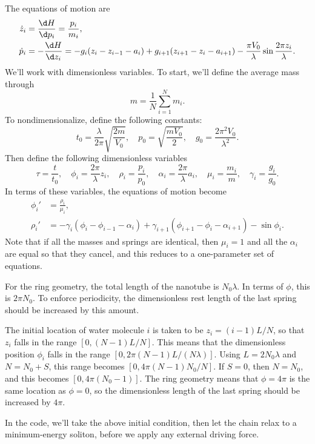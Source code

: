 \documentclass[11pt]{article}
\begin{document}
The equations of motion are
\begin{align*}
\dot{z}_i&=\frac{\d H}{\d p_i}=\frac{p_i}{m_i},\\
\dot{p}_i&=-\frac{\d H}{\d z_i}=-g_i(z_i-z_{i-1}-a_i)
	+g_{i+1}(z_{i+1}-z_i-a_{i+1})
	-\frac{\pi V_0}{\lambda}\sin\frac{2\pi z_i}{\lambda}.
\end{align*}
We'll work with dimensionless variables. To start, we'll define the average mass through
\[
m=\frac{1}{N}\sum_{i=1}^N m_i.
\]
To nondimensionalize, define the following constants:
\[
t_0 = \frac{\lambda}{2\pi}\sqrt{\frac{2m}{V_0}},\quad
p_0 = \sqrt{\frac{mV_0}{2}},\quad
g_0 = \frac{2\pi^2V_0}{\lambda^2}.
\]
Then define the following dimensionless variables
\[
\tau=\frac{t}{t_0},\quad
\phi_i=\frac{2\pi}{\lambda} z_i,\quad
\rho_i=\frac{p_i}{p_0},\quad
\alpha_i=\frac{2\pi}{\lambda} a_i,\quad
\mu_i=\frac{m_i}{m},\quad
\gamma_i=\frac{g_i}{g_0}.
\]
In terms of these variables, the equations of motion become
\begin{align*}
\phi_i'&=\frac{\rho_i}{\mu_i},\\
\rho_i'&=-\gamma_i(\phi_i-\phi_{i-1}-\alpha_i)
	+\gamma_{i+1}(\phi_{i+1}-\phi_i-\alpha_{i+1})
	-\sin\phi_i.
\end{align*}
Note that if all the masses and springs are identical, then $\mu_i=1$ and all the $\alpha_i$ are equal so that they cancel, and this reduces to a one-parameter set of equations.

For the ring geometry, the total length of the nanotube is $N_0\lambda$. In terms of $\phi$, this is $2\pi N_0$. To enforce periodicity, the dimensionless rest length of the last spring should be increased by this amount.

The initial location of water molecule $i$ is taken to be $z_i=(i-1)L/N$, so that $z_i$ falls in the range $[0,(N-1)L/N]$. This means that the dimensionless position $\phi_i$ falls in the range $[0,2\pi(N-1)L/(N\lambda)]$. Using $L=2N_0\lambda$ and $N=N_0+S$, this range becomes $[0,4\pi(N-1)N_0/N]$. If $S=0$, then $N=N_0$, and this becomes $[0,4\pi(N_0-1)]$. The ring geometry means that $\phi=4\pi$ is the same location as $\phi=0$, so the dimensionless length of the last spring should be increased by $4\pi$.

In the code, we'll take the above initial condition, then let the chain relax to a minimum-energy soliton, before we apply any external driving force.
\end{document}
